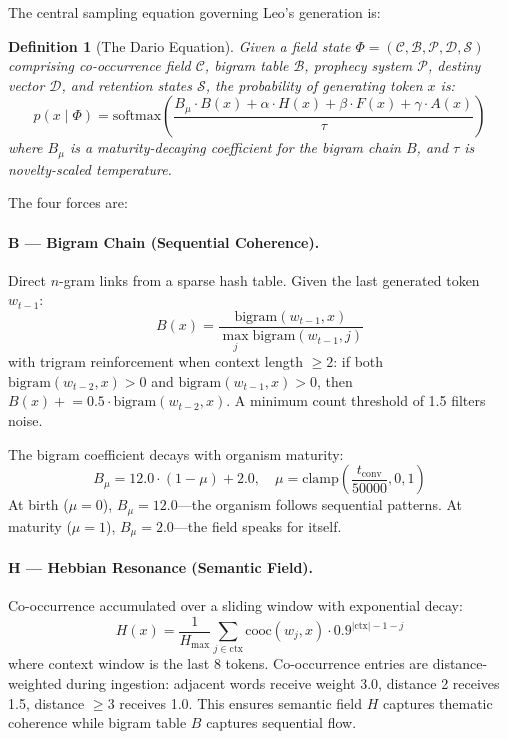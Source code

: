 \documentclass[11pt,twocolumn]{article}
\newtheorem{definition}{Definition}
\begin{document}
The central sampling equation governing Leo's generation is:

\begin{definition}[The Dario Equation]
Given a field state $\Phi = (\mathcal{C}, \mathcal{B}, \mathcal{P}, \mathcal{D}, \mathcal{S})$ comprising co-occurrence field $\mathcal{C}$, bigram table $\mathcal{B}$, prophecy system $\mathcal{P}$, destiny vector $\mathcal{D}$, and retention states $\mathcal{S}$, the probability of generating token $x$ is:
\begin{equation}
\label{eq:dario}
  p(x \mid \Phi) = \text{softmax}\!\left(\frac{B_\mu \cdot B(x) + \alpha \cdot H(x) + \beta \cdot F(x) + \gamma \cdot A(x)}{\tau}\right)
\end{equation}
where $B_\mu$ is a maturity-decaying coefficient for the bigram chain $B$, and $\tau$ is novelty-scaled temperature.
\end{definition}

The four forces are:

\paragraph{B --- Bigram Chain (Sequential Coherence).}
Direct $n$-gram links from a sparse hash table. Given the last generated token $w_{t-1}$:
\begin{equation}
  B(x) = \frac{\text{bigram}(w_{t-1}, x)}{\max_j \text{bigram}(w_{t-1}, j)}
\end{equation}
with trigram reinforcement when context length $\geq 2$: if both $\text{bigram}(w_{t-2}, x) > 0$ and $\text{bigram}(w_{t-1}, x) > 0$, then $B(x) \mathrel{+}= 0.5 \cdot \text{bigram}(w_{t-2}, x)$. A minimum count threshold of 1.5 filters noise.

The bigram coefficient decays with organism maturity:
\begin{equation}
  B_\mu = 12.0 \cdot (1 - \mu) + 2.0, \quad \mu = \text{clamp}\!\left(\frac{t_{\text{conv}}}{50000}, 0, 1\right)
\end{equation}
At birth ($\mu = 0$), $B_\mu = 12.0$---the organism follows sequential patterns. At maturity ($\mu = 1$), $B_\mu = 2.0$---the field speaks for itself.

\paragraph{H --- Hebbian Resonance (Semantic Field).}
Co-occurrence accumulated over a sliding window with exponential decay:
\begin{equation}
  H(x) = \frac{1}{H_{\max}} \sum_{j \in \text{ctx}} \text{cooc}(w_j, x) \cdot 0.9^{|\text{ctx}| - 1 - j}
\end{equation}
where context window is the last 8 tokens. Co-occurrence entries are distance-weighted during ingestion: adjacent words receive weight 3.0, distance 2 receives 1.5, distance $\geq 3$ receives 1.0. This ensures semantic field $H$ captures thematic coherence while bigram table $B$ captures sequential flow.
\end{document}
